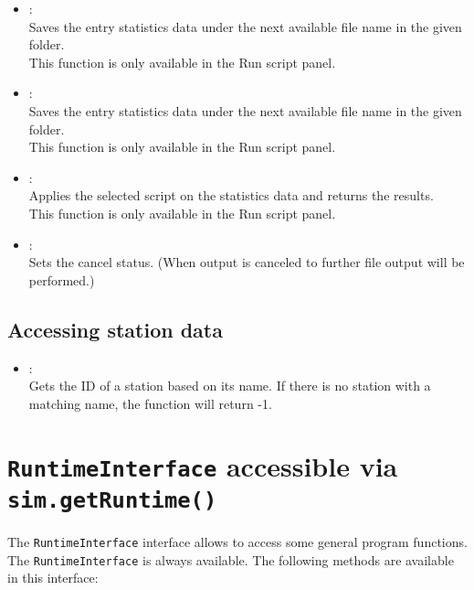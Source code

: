 \begin{itemize}

\item
{}:\\
Saves the entry statistics data under the next available file name in the given folder.\\
This function is only available in the Run script panel.

\item
{}:\\
Saves the entry statistics data under the next available file name in the given folder.\\
This function is only available in the Run script panel.

\item
{}:\\
Applies the selected script on the statistics data and returns the results.\\
This function is only available in the Run script panel.

\item
{}:\\
Sets the cancel status. (When output is canceled to further file output will be performed.)

\end{itemize}

\section{Accessing station data}

\begin{itemize}

\item
{}:\\
Gets the ID of a station based on its name.
If there is no station with a matching name, the function will return -1.

\end{itemize}



\chapter{\texttt{RuntimeInterface} accessible via \texttt{sim.getRuntime()}}

The \texttt{RuntimeInterface} interface allows to access some general program functions.\\
The \texttt{RuntimeInterface} is always available. The following methods are available in this interface:

